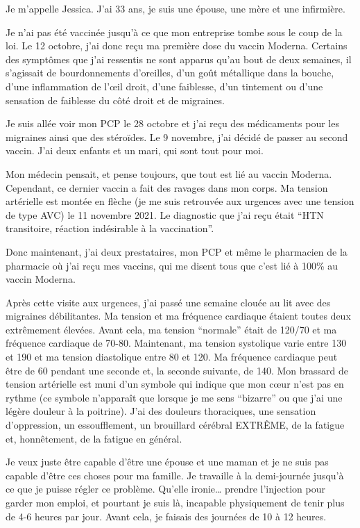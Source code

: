 Je m'appelle Jessica. J'ai 33 ans, je suis une épouse, une mère et une
infirmière.

Je n'ai pas été vaccinée jusqu'à ce que mon entreprise tombe sous le coup de la
loi. Le 12 octobre, j'ai donc reçu ma première dose du vaccin Moderna. Certains
des symptômes que j'ai ressentis ne sont apparus qu'au bout de deux semaines, il
s'agissait de bourdonnements d'oreilles, d'un goût métallique dans la bouche,
d'une inflammation de l'œil droit, d'une faiblesse, d'un tintement ou d'une
sensation de faiblesse du côté droit et de migraines.

Je suis allée voir mon PCP le 28 octobre et j'ai reçu des médicaments pour les
migraines ainsi que des stéroïdes. Le 9 novembre, j'ai décidé de passer au
second vaccin. J'ai deux enfants et un mari, qui sont tout pour moi.

Mon médecin pensait, et pense toujours, que tout est lié au vaccin
Moderna. Cependant, ce dernier vaccin a fait des ravages dans mon corps. Ma
tension artérielle est montée en flèche (je me suis retrouvée aux urgences avec
une tension de type AVC) le 11 novembre 2021. Le diagnostic que j'ai reçu était
“HTN transitoire, réaction indésirable à la vaccination”.

Donc maintenant, j'ai deux prestataires, mon PCP et même le pharmacien de la
pharmacie où j'ai reçu mes vaccins, qui me disent tous que c'est lié à 100\% au
vaccin Moderna.

Après cette visite aux urgences, j'ai passé une semaine clouée au lit avec des
migraines débilitantes. Ma tension et ma fréquence cardiaque étaient toutes deux
extrêmement élevées. Avant cela, ma tension “normale” était de 120/70 et ma
fréquence cardiaque de 70-80. Maintenant, ma tension systolique varie entre 130
et 190 et ma tension diastolique entre 80 et 120. Ma fréquence cardiaque peut
être de 60 pendant une seconde et, la seconde suivante, de 140. Mon brassard de
tension artérielle est muni d'un symbole qui indique que mon cœur n'est pas en
rythme (ce symbole n'apparaît que lorsque je me sens “bizarre” ou que j'ai une
légère douleur à la poitrine). J'ai des douleurs thoraciques, une sensation
d'oppression, un essoufflement, un brouillard cérébral EXTRÊME, de la fatigue
et, honnêtement, de la fatigue en général.

Je veux juste être capable d'être une épouse et une maman et je ne suis pas
capable d'être ces choses pour ma famille. Je travaille à la demi-journée
jusqu'à ce que je puisse régler ce problème. Qu'elle ironie… prendre l'injection
pour garder mon emploi, et pourtant je suis là, incapable physiquement de tenir
plus de 4-6 heures par jour. Avant cela, je faisais des journées de 10 à 12
heures.

